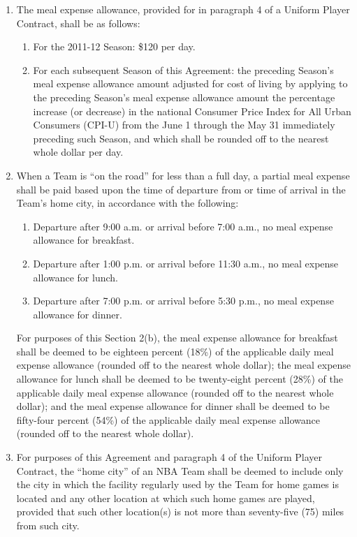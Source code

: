 \documentclass[
]{book}
\providecommand{\tightlist}{%
  \setlength{\itemsep}{0pt}\setlength{\parskip}{0pt}}
\begin{document}
\begin{enumerate}
\def\labelenumi{(\alph{enumi})}
\tightlist
\item
  The meal expense allowance, provided for in paragraph 4 of a Uniform Player Contract, shall be as follows:

  \begin{enumerate}
  \def\labelenumii{(\roman{enumii})}
  \tightlist
  \item
    For the 2011-12 Season: \$120 per day.
  \item
    For each subsequent Season of this Agreement: the preceding Season's meal expense allowance amount adjusted for cost of living by applying to the preceding Season's meal expense allowance amount the percentage increase (or decrease) in the national Consumer Price Index for All Urban Consumers (CPI-U) from the June 1 through the May 31 immediately preceding such Season, and which shall be rounded off to the nearest whole dollar per day.
  \end{enumerate}
\item
  When a Team is ``on the road'' for less than a full day, a partial meal expense shall be paid based upon the time of departure from or time of arrival in the Team's home city, in accordance with the following:

  \begin{enumerate}
  \def\labelenumii{(\roman{enumii})}
  \tightlist
  \item
    Departure after 9:00 a.m. or arrival before 7:00 a.m., no meal expense allowance for breakfast.
  \item
    Departure after 1:00 p.m. or arrival before 11:30 a.m., no meal expense allowance for lunch.
  \item
    Departure after 7:00 p.m. or arrival before 5:30 p.m., no meal expense allowance for dinner.
  \end{enumerate}

  For purposes of this Section 2(b), the meal expense allowance for breakfast shall be deemed to be eighteen percent (18\%) of the applicable daily meal expense allowance (rounded off to the nearest whole dollar); the meal expense allowance for lunch shall be deemed to be twenty-eight percent (28\%) of the applicable daily meal expense allowance (rounded off to the nearest whole dollar); and the meal expense allowance for dinner shall be deemed to be fifty-four percent (54\%) of the applicable daily meal expense allowance (rounded off to the nearest whole dollar).
\item
  For purposes of this Agreement and paragraph 4 of the Uniform Player Contract, the ``home city'' of an NBA Team shall be deemed to include only the city in which the facility regularly used by the Team for home games is located and any other location at which such home games are played, provided that such other location(s) is not more than seventy-five (75) miles from such city.
\end{enumerate}
\end{document}

